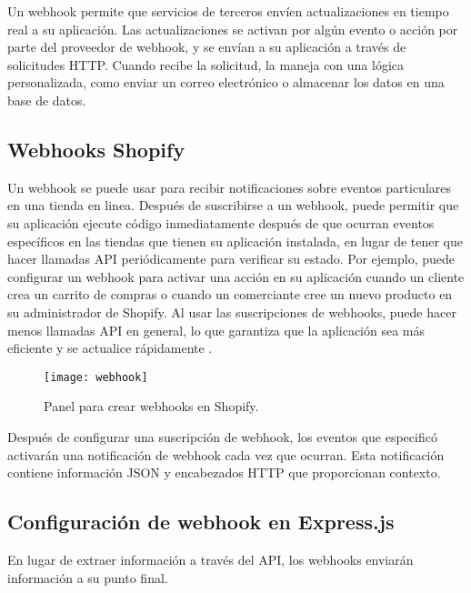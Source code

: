 Un webhook permite que servicios de terceros envíen actualizaciones en tiempo real a su aplicación. Las actualizaciones se activan por algún evento o acción por parte del proveedor de webhook, y se envían a su aplicación a través de solicitudes HTTP. Cuando recibe la solicitud, la maneja con una lógica personalizada, como enviar un correo electrónico o almacenar los datos en una base de datos.

\subsection{Webhooks Shopify}
Un webhook se puede usar para recibir notificaciones sobre eventos particulares en una tienda en linea. Después de suscribirse a un webhook, puede permitir que su aplicación ejecute código inmediatamente después de que ocurran eventos específicos en las tiendas que tienen su aplicación instalada, en lugar de tener que hacer llamadas API periódicamente para verificar su estado. Por ejemplo, puede configurar un webhook para activar una acción en su aplicación cuando un cliente crea un carrito de compras o cuando un comerciante cree un nuevo producto en su administrador de Shopify. Al usar las suscripciones de webhooks, puede hacer menos llamadas API en general, lo que garantiza que la aplicación sea más eficiente y se actualice rápidamente \cite{webhook}.
\vspace{0.8cm}

\begin{figure}[H]
  \centering
  \texttt{[image: webhook]}
  \caption{Panel para crear webhooks en Shopify.}
\end{figure}

Después de configurar una suscripción de webhook, los eventos que especificó activarán una notificación de webhook cada vez que ocurran. Esta notificación contiene información JSON y encabezados HTTP que proporcionan contexto.

\newpage
\subsection{Configuración de webhook en Express.js}
En lugar de extraer información a través del API, los webhooks enviarán información a su punto final.
\vspace{0.8cm}


